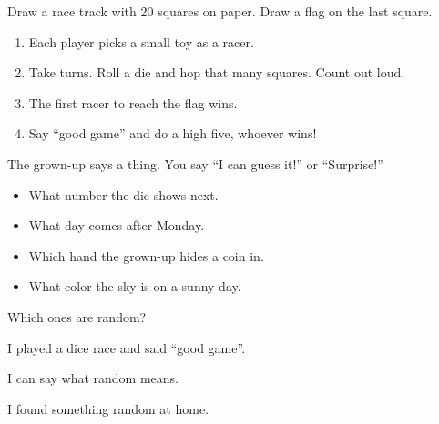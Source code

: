 
\begin{playathome}
Draw a race track with 20 squares on paper. Draw a flag on the last square.
\begin{enumerate}[leftmargin=1.4em,itemsep=2pt]
  \item Each player picks a small toy as a racer.
  \item Take turns. Roll a die and hop that many squares. Count out loud.
  \item The first racer to reach the flag wins.
  \item Say \enquote{good game} and do a high five, whoever wins!
\end{enumerate}
\end{playathome}

\begin{playathome}
The grown-up says a thing. You say \enquote{I can guess it!} or \enquote{Surprise!}
\begin{itemize}[leftmargin=1.4em,itemsep=2pt]
  \item What number the die shows next.
  \item What day comes after Monday.
  \item Which hand the grown-up hides a coin in.
  \item What color the sky is on a sunny day.
\end{itemize}
Which ones are random?
\end{playathome}

\begin{selfcheck}
  \item I played a dice race and said \enquote{good game}.
  \item I can say what random means.
  \item I found something random at home.
\end{selfcheck}
